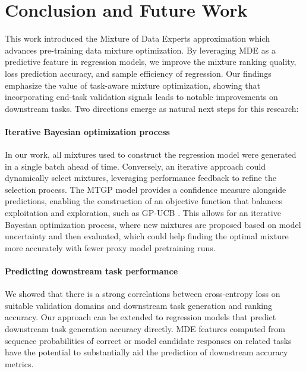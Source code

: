 
\section{Conclusion and Future Work}

This work introduced the Mixture of Data Experts approximation which advances pre-training data mixture optimization. By leveraging MDE as a predictive feature in regression models, we improve the mixture ranking quality, loss prediction accuracy, and sample efficiency of regression. Our findings emphasize the value of task-aware mixture optimization, showing that incorporating end-task validation signals leads to notable improvements on downstream tasks. Two directions emerge as natural next steps for this research:

\paragraph{Iterative Bayesian optimization process}

In our work, all mixtures used to construct the regression model were generated in a single batch ahead of time. Conversely, an iterative approach could dynamically select mixtures, leveraging performance feedback to refine the selection process. The MTGP model provides a confidence measure alongside predictions, enabling the construction of an objective function that balances exploitation and exploration, such as GP-UCB \cite{gp-ucb}. This allows for an iterative Bayesian optimization process, where new mixtures are proposed based on model uncertainty and then evaluated, which could help finding the optimal mixture more accurately with fewer proxy model pretraining runs. 


\paragraph{Predicting downstream task performance}

We showed that there is a strong correlations between cross-entropy loss on suitable validation domains and downstream task generation and ranking accuracy. Our approach can be extended to regression models that predict downstream task generation accuracy directly. MDE features computed from sequence probabilities of correct or model candidate responses on related tasks have the potential to substantially aid the prediction of downstream accuracy metrics.


